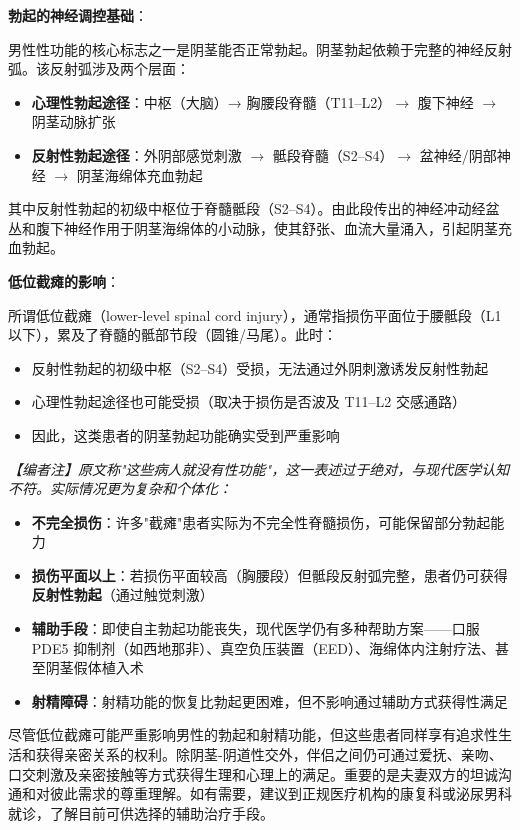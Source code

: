 \begin{enumerate}
\vspace{0.5em}
\noindent\textbf{勃起的神经调控基础}：

男性性功能的核心标志之一是阴茎能否正常勃起。阴茎勃起依赖于完整的神经反射弧。该反射弧涉及两个层面：
\begin{itemize}
	\item \textbf{心理性勃起途径}：中枢（大脑）→ 胸腰段脊髓（T11--L2）$\rightarrow$ 腹下神经 $\rightarrow$ 阴茎动脉扩张
	\item \textbf{反射性勃起途径}：外阴部感觉刺激 $\rightarrow$ 骶段脊髓（S2--S4）$\rightarrow$ 盆神经/阴部神经 $\rightarrow$ 阴茎海绵体充血勃起
\end{itemize}

其中反射性勃起的初级中枢位于脊髓骶段（S2--S4）。由此段传出的神经冲动经盆丛和腹下神经作用于阴茎海绵体的小动脉，使其舒张、血流大量涌入，引起阴茎充血勃起。

\vspace{0.5em}
\noindent\textbf{低位截瘫的影响}：

所谓低位截瘫（lower-level spinal cord injury），通常指损伤平面位于腰骶段（L1以下），累及了脊髓的骶部节段（圆锥/马尾）。此时：
\begin{itemize}
	\item 反射性勃起的初级中枢（S2--S4）受损，无法通过外阴刺激诱发反射性勃起
	\item 心理性勃起途径也可能受损（取决于损伤是否波及 T11--L2 交感通路）
	\item 因此，这类患者的阴茎勃起功能确实受到严重影响
\end{itemize}

\noindent\textit{【编者注】原文称"这些病人就没有性功能"，这一表述过于绝对，与现代医学认知不符。实际情况更为复杂和个体化：}

\begin{itemize}
	\item \textbf{不完全损伤}：许多"截瘫"患者实际为不完全性脊髓损伤，可能保留部分勃起能力
	\item \textbf{损伤平面以上}：若损伤平面较高（胸腰段）但骶段反射弧完整，患者仍可获得\textbf{反射性勃起}（通过触觉刺激）
	\item \textbf{辅助手段}：即使自主勃起功能丧失，现代医学仍有多种帮助方案——口服 PDE5 抑制剂（如西地那非）、真空负压装置（EED）、海绵体内注射疗法、甚至阴茎假体植入术
	\item \textbf{射精障碍}：射精功能的恢复比勃起更困难，但不影响通过辅助方式获得性满足
\end{itemize}

\begin{tcolorbox}[colback=pink!5!white,colframe=red!50!black,title=贴心小叮咛]
尽管低位截瘫可能严重影响男性的勃起和射精功能，但这些患者同样享有追求性生活和获得亲密关系的权利。除阴茎-阴道性交外，伴侣之间仍可通过爱抚、亲吻、口交刺激及亲密接触等方式获得生理和心理上的满足。重要的是夫妻双方的坦诚沟通和对彼此需求的尊重理解。如有需要，建议到正规医疗机构的康复科或泌尿男科就诊，了解目前可供选择的辅助治疗手段。
\end{tcolorbox}


\end{enumerate}
